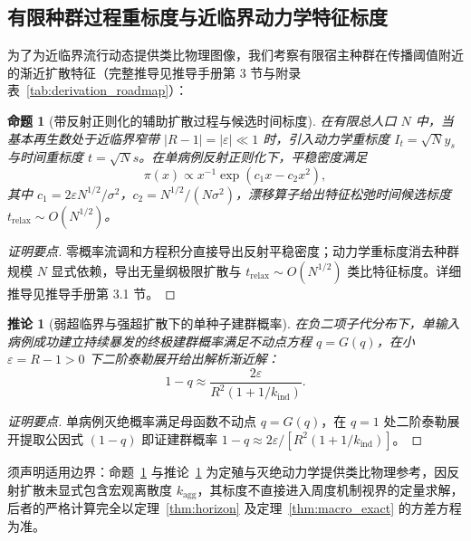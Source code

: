 \documentclass[11pt,a4paper]{article}
\theoremstyle{plain}
\newtheorem{proposition}{命题}
\newtheorem{corollary}{推论}
\theoremstyle{definition}
\begin{document}
\subsection{有限种群过程重标度与近临界动力学特征标度}\label{sec:qsd}

为了为近临界流行动态提供类比物理图像，我们考察有限宿主种群在传播阈值附近的渐近扩散特征（完整推导见推导手册第 3 节与附录表~\ref{tab:derivation_roadmap}）：

\begin{proposition}[带反射正则化的辅助扩散过程与候选时间标度]\label{prop:qsd}
在有限总人口 $N$ 中，当基本再生数处于近临界窄带 $|R-1| = |\varepsilon| \ll 1$ 时，引入动力学重标度 $I_t = \sqrt{N} y_s$ 与时间重标度 $t = \sqrt{N} s$。在单病例反射正则化下，平稳密度满足
\begin{equation}
\pi(x) \propto x^{-1} \exp(c_1 x - c_2 x^2), \label{eq:qsd_density}
\end{equation}
其中 $c_1 = 2\varepsilon N^{1/2}/\sigma^2$，$c_2 = N^{1/2}/(N\sigma^2)$，漂移算子给出特征松弛时间候选标度 $t_{\text{relax}} \sim O(N^{1/2})$。
\end{proposition}

\begin{proof}[证明要点]
零概率流调和方程积分直接导出反射平稳密度；动力学重标度消去种群规模 $N$ 显式依赖，导出无量纲极限扩散与 $t_{\text{relax}} \sim O(N^{1/2})$ 类比特征标度。详细推导见推导手册第 3.1 节。
\end{proof}

\begin{corollary}[弱超临界与强超扩散下的单种子建群概率]\label{cor:establishment}
在负二项子代分布下，单输入病例成功建立持续暴发的终极建群概率满足不动点方程 $q = G(q)$，在小 $\varepsilon = R-1 > 0$ 下二阶泰勒展开给出解析渐近解：
\begin{equation}
1 - q \approx \frac{2\varepsilon}{R^2(1 + 1/k_{\text{ind}})}.
\label{eq:pgf_fixed_point}
\end{equation}
\end{corollary}

\begin{proof}[证明要点]
单病例灭绝概率满足母函数不动点 $q = G(q)$，在 $q=1$ 处二阶泰勒展开提取公因式 $(1-q)$ 即证建群概率 $1-q \approx 2\varepsilon/[R^2(1+1/k_{\text{ind}})]$。
\end{proof}

须声明适用边界：命题~\ref{prop:qsd} 与推论~\ref{cor:establishment} 为定殖与灭绝动力学提供类比物理参考，因反射扩散未显式包含宏观离散度 $k_{\text{agg}}$，其标度不直接进入周度机制视界的定量求解，后者的严格计算完全以定理~\ref{thm:horizon} 及定理~\ref{thm:macro_exact} 的方差方程为准。
\end{document}
